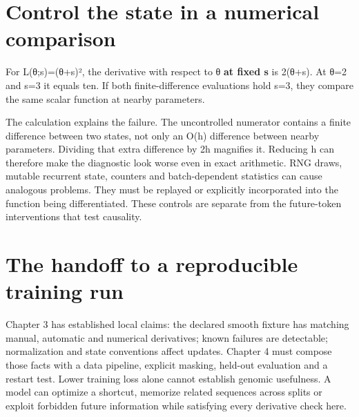 \section{Control the state in a numerical
comparison}\label{control-the-state-in-a-numerical-comparison}

For L(θ;s)=(θ+s)², the derivative with respect to θ \textbf{at fixed s}
is 2(θ+s). At θ=2 and s=3 it equals ten. If both finite-difference
evaluations hold s=3, they compare the same scalar function at nearby
parameters.


The calculation explains the failure. The uncontrolled numerator
contains a finite difference between two states, not only an O(h)
difference between nearby parameters. Dividing that extra difference by
2h magnifies it. Reducing h can therefore make the diagnostic look worse
even in exact arithmetic. RNG draws, mutable recurrent state, counters
and batch-dependent statistics can cause analogous problems. They must
be replayed or explicitly incorporated into the function being
differentiated. These controls are separate from the future-token
interventions that test causality.

\section{The handoff to a reproducible training
run}\label{the-handoff-to-a-reproducible-training-run}


Chapter 3 has established local claims: the declared smooth fixture has
matching manual, automatic and numerical derivatives; known failures are
detectable; normalization and state conventions affect updates. Chapter
4 must compose those facts with a data pipeline, explicit masking,
held-out evaluation and a restart test. Lower training loss alone cannot
establish genomic usefulness. A model can optimize a shortcut, memorize
related sequences across splits or exploit forbidden future information
while satisfying every derivative check here.

